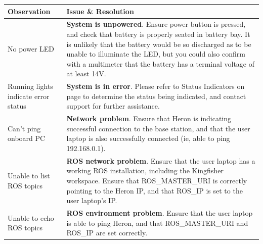 \documentclass[]{clearpath-latex/clearpath-manual}
\begin{document}
\bgroup
\def\arraystretch{1.5}%
\begin{table}[h]
\centering
\label{troublshooting}
\begin{tabular}{p{} p{}}

\rowcolor{lightgrey} 
{\bf Observation}                    & {\bf Issue \& Resolution}                                                                                                                                                                                                                                                                                          \\ \hline
No power LED                         & \textbf{System is unpowered}. Ensure power button is pressed, and check that battery is properly seated in battery bay. It is unlikely that the battery would be so discharged as to be unable to illuminate the LED, but you could also confirm with a multimeter that the battery has a terminal voltage of at least 14V. \\ \hline
Running lights indicate error status & \textbf{System is in error}. Please refer to Status Indicators on page \pageref{statusindicators} to determine the status being indicated, and contact support for further assistance.                                                                                                                                                               \\ \hline
Can’t ping onboard PC                & \textbf{Network problem}. Ensure that Heron is indicating successful connection to the base station, and that the user laptop is also successfully connected (ie, able to ping 192.168.0.1).                                                                                                                           \\ \hline
Unable to list ROS topics            & \textbf{ROS network problem}. Ensure that the user laptop has a working ROS installation, including the Kingfisher workspace. Ensure that ROS\_MASTER\_URI is correctly pointing to the Heron IP, and that ROS\_IP is set to the user laptop’s IP.                                                                     \\ \hline
Unable to echo ROS topics            & \textbf{ROS environment problem}. Ensure that the user laptop is able to ping Heron, and that ROS\_MASTER\_URI and ROS\_IP are set correctly.                                                                                                                                                                          \\ \hline
\end{tabular}
\end{table}
\egroup
\end{document}
